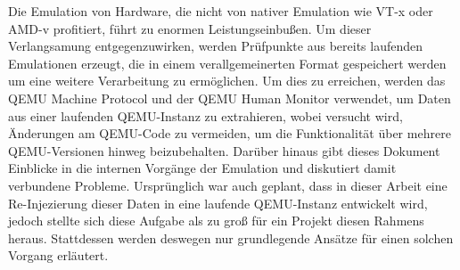 
\Abstract
Die Emulation von Hardware, die nicht von nativer Emulation wie VT-x oder AMD-v profitiert, führt zu enormen Leistungseinbußen.
Um dieser Verlangsamung entgegenzuwirken, werden Prüfpunkte aus bereits laufenden Emulationen erzeugt,
die in einem verallgemeinerten Format gespeichert werden um eine weitere Verarbeitung zu ermöglichen.
Um dies zu erreichen, werden das QEMU Machine Protocol und der QEMU Human Monitor verwendet, um Daten aus einer laufenden QEMU-Instanz zu extrahieren,
wobei versucht wird, Änderungen am QEMU-Code zu vermeiden, um die Funktionalität über mehrere QEMU-Versionen hinweg beizubehalten.
Darüber hinaus gibt dieses Dokument Einblicke in die internen Vorgänge der Emulation und diskutiert damit verbundene Probleme.
Ursprünglich war auch geplant, dass in dieser Arbeit eine Re-Injezierung dieser Daten in eine laufende QEMU-Instanz entwickelt wird,
jedoch stellte sich diese Aufgabe als zu groß für ein Projekt diesen Rahmens heraus.
Stattdessen werden deswegen nur grundlegende Ansätze für einen solchen Vorgang erläutert.